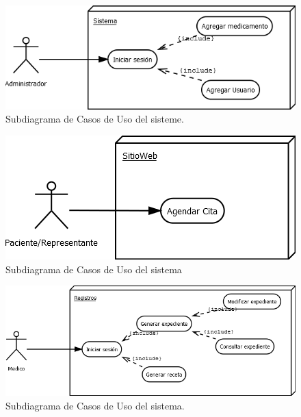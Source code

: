 \documentclass[oneside,10pt]{book}
\begin{document}
	\begin{figure}[htbp!]
	\centering
		\includegraphics[width=1\textwidth]{images/cu/administrador}
		\caption{Subdiagrama de Casos de Uso del sisteme.}
	\end{figure}
	\begin{figure}[htbp!]
	\centering
		\includegraphics[width=1\textwidth]{images/cu/paciente_rep}
		\caption{Subdiagrama de Casos de Uso del sistema}
	\end{figure}
	\begin{figure}[htbp!]
	\centering
		\includegraphics[width=1\textwidth]{images/cu/medico}
		\caption{Subdiagrama de Casos de Uso del sistema.}
	\end{figure}
	
\end{document}
